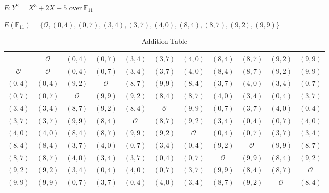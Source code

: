 \documentclass[12pt]{article}
\begin{document}
\newpage
\subproblem $E:Y^2=X^3+2X+5$ over $\mathbb{F}_{11}$

\solution $E(\mathbb{F}_{11})=\{\mathcal{O},(0,4),(0,7),(3,4),(3,7),(4,0),(8,4),(8,7),(9,2),(9,9)\}$
\begin{table}[!ht]
    \centering
    \begin{tabular}{|c||c|c|c|c|c|c|c|c|c|c|}
        \hline
                      & $\mathcal{O}$ & $(0,4)$       & $(0,7)$       & $(3,4)$       & $(3,7)$       & $(4,0)$       & $(8,4)$       & $(8,7)$       & $(9,2)$       & $(9,9)$       \\ \hline\hline
        $\mathcal{O}$ & $\mathcal{O}$ & $(0,4)$       & $(0,7)$       & $(3,4)$       & $(3,7)$       & $(4,0)$       & $(8,4)$       & $(8,7)$       & $(9,2)$       & $(9,9)$       \\ \hline
        $(0,4)$       & $(0,4)$       & $(9,2)$       & $\mathcal{O}$ & $(8,7)$       & $(9,9)$       & $(8,4)$       & $(3,7)$       & $(4,0)$       & $(3,4)$       & $(0,7)$       \\ \hline
        $(0,7)$       & $(0,7)$       & $\mathcal{O}$ & $(9,9)$       & $(9,2)$       & $(8,4)$       & $(8,7)$       & $(4,0)$       & $(3,4)$       & $(0,4)$       & $(3,7)$       \\ \hline
        $(3,4)$       & $(3,4)$       & $(8,7)$       & $(9,2)$       & $(8,4)$       & $\mathcal{O}$ & $(9,9)$       & $(0,7)$       & $(3,7)$       & $(4,0)$       & $(0,4)$       \\ \hline
        $(3,7)$       & $(3,7)$       & $(9,9)$       & $(8,4)$       & $\mathcal{O}$ & $(8,7)$       & $(9,2)$       & $(3,4)$       & $(0,4)$       & $(0,7)$       & $(4,0)$       \\ \hline
        $(4,0)$       & $(4,0)$       & $(8,4)$       & $(8,7)$       & $(9,9)$       & $(9,2)$       & $\mathcal{O}$ & $(0,4)$       & $(0,7)$       & $(3,7)$       & $(3,4)$       \\ \hline
        $(8,4)$       & $(8,4)$       & $(3,7)$       & $(4,0)$       & $(0,7)$       & $(3,4)$       & $(0,4)$       & $(9,2)$       & $\mathcal{O}$ & $(9,9)$       & $(8,7)$       \\ \hline
        $(8,7)$       & $(8,7)$       & $(4,0)$       & $(3,4)$       & $(3,7)$       & $(0,4)$       & $(0,7)$       & $\mathcal{O}$ & $(9,9)$       & $(8,4)$       & $(9,2)$       \\ \hline
        $(9,2)$       & $(9,2)$       & $(3,4)$       & $(0,4)$       & $(4,0)$       & $(0,7)$       & $(3,7)$       & $(9,9)$       & $(8,4)$       & $(8,7)$       & $\mathcal{O}$ \\ \hline
        $(9,9)$       & $(9,9)$       & $(0,7)$       & $(3,7)$       & $(0,4)$       & $(4,0)$       & $(3,4)$       & $(8,7)$       & $(9,2)$       & $\mathcal{O}$ & $(8,4)$       \\ \hline
    \end{tabular}
    \caption{Addition Table}
\end{table}
\end{document}
